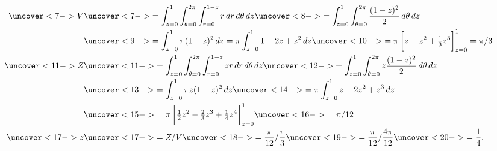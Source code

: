 \documentclass[9pt]{beamer}
\begin{document}
\begin{frame}[t]
\begin{minipage}[t]{3cm}
 \end{minipage}
 \begin{align*}
  \uc<7->{V}
    &\uc<7->{= \int_{z=0}^1 \int_{\tht=0}^{2\pi} \int_{r=0}^{1-z}
        r\,dr\,d\tht\,dz} 
     \uc<8->{= \int_{z=0}^1 \int_{\tht=0}^{2\pi} \frac{(1-z)^2}{2}\,d\tht\,dz} \\
    &\uc<9->{= \int_{z=0}^1 \pi (1-z)^2\,dz = \pi \int_{z=0}^1 1-2z+z^2\,dz }
     \uc<10->{= \pi\CH{z-z^2+\tfrac{1}{3}z^3}_{z=0}^1 = \pi/3} \\
  \uc<11->{Z}
    &\uc<11->{= \int_{z=0}^1 \int_{\tht=0}^{2\pi} \int_{r=0}^{1-z}
        zr\,dr\,d\tht\,dz} 
     \uc<12->{= \int_{z=0}^1 \int_{\tht=0}^{2\pi} z\frac{(1-z)^2}{2}\,d\tht\,dz} \\
    &\uc<13->{= \int_{z=0}^1 \pi z(1-z)^2\,dz}\uc<14->{ = \pi \int_{z=0}^1 z-2z^2+z^3\,dz} \\
    &\uc<15->{= \pi\CH{\half z^2-\tfrac{2}{3}z^3+\tfrac{1}{4}z^4}_{z=0}^1}\uc<16->{ = \pi/12} \\
  \uc<17->{\ov{z}} &\uc<17->{= Z/V}\uc<18->{ = \frac{\pi}{12}/\frac{\pi}{3}}
            \uc<19->{= \frac{\pi}{12}/\frac{4\pi}{12}}\uc<20->{ = \frac{1}{4}.}
 \end{align*}
\end{frame}
\end{document}
